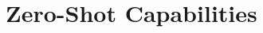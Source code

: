 \documentclass[a4paper, oneside, english]{sapthesis} %
\begin{document}

\section{Zero-Shot Capabilities}
\end{document}
